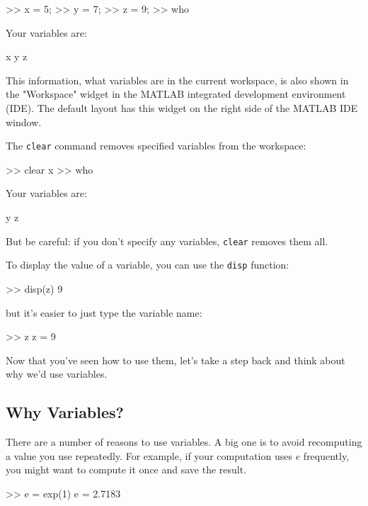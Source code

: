 \documentclass[../../book.tex]{subfiles}
\begin{document}

\begin{code}
>> x = 5;
>> y = 7;
>> z = 9;
>> who

Your variables are:

x  y  z
\end{code}

This information, what variables are in the current workspace, is also shown in the "Workspace" widget in the MATLAB integrated development environment (IDE).  The default layout has this widget on the right side of the MATLAB IDE window.

The \lstinline{clear} command removes specified variables from the workspace:

\begin{code}
>> clear x
>> who

Your variables are:

y z
\end{code}

But be careful: if you don't specify any variables, \lstinline{clear} removes them all.


To display the value of a variable, you can use the \lstinline{disp} function:

\begin{code}
>> disp(z)
     9
\end{code}
but it's easier to just type the variable name:

\begin{code}
>> z
z = 9
\end{code}

Now that you've seen how to use them, let's take a step back and think about why we'd use variables.

\subsection{Why Variables?}

There are a number of reasons to use variables.
A big one is to avoid recomputing a value you use repeatedly.  For
example, if your computation uses $e$ frequently, you might
want to compute it once and save the result.

\begin{code}
>> e = exp(1)
e = 2.7183
\end{code}
\end{document}
